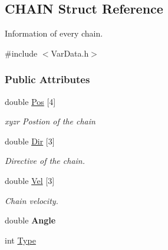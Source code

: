 \hypertarget{structCHAIN}{\subsection{\-C\-H\-A\-I\-N \-Struct \-Reference}
\label{structCHAIN}
}


\-Information of every chain.  




{\ttfamily \#include $<$\-Var\-Data.\-h$>$}

\subsubsection*{\-Public \-Attributes}
\begin{DoxyCompactItemize}
\item 
\hypertarget{structCHAIN_ac00d29ea47aa8845638961a34cb3ec0e}{double \hyperlink{structCHAIN_ac00d29ea47aa8845638961a34cb3ec0e}{\-Pos} \mbox{[}4\mbox{]}}\label{structCHAIN_ac00d29ea47aa8845638961a34cb3ec0e}

\begin{DoxyCompactList}\small\item\em xyzr \-Postion of the chain \end{DoxyCompactList}\item 
\hypertarget{structCHAIN_ac77c91979738079508cf3f257a7164ba}{double \hyperlink{structCHAIN_ac77c91979738079508cf3f257a7164ba}{\-Dir} \mbox{[}3\mbox{]}}\label{structCHAIN_ac77c91979738079508cf3f257a7164ba}

\begin{DoxyCompactList}\small\item\em \-Directive of the chain. \end{DoxyCompactList}\item 
\hypertarget{structCHAIN_ae3fae9edc78d8cadc33c5a52bebdb46c}{double \hyperlink{structCHAIN_ae3fae9edc78d8cadc33c5a52bebdb46c}{\-Vel} \mbox{[}3\mbox{]}}\label{structCHAIN_ae3fae9edc78d8cadc33c5a52bebdb46c}

\begin{DoxyCompactList}\small\item\em \-Chain velocity. \end{DoxyCompactList}\item 
\hypertarget{structCHAIN_a8c10230001bab42de01beb2843f8c327}{double {\bfseries \-Angle}}\label{structCHAIN_a8c10230001bab42de01beb2843f8c327}

\item 
\hypertarget{structCHAIN_ae011432eaca3858364b05a111f4011d3}{int \hyperlink{structCHAIN_ae011432eaca3858364b05a111f4011d3}{\-Type}}\label{structCHAIN_ae011432eaca3858364b05a111f4011d3}


\end{DoxyCompactItemize}
